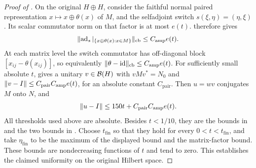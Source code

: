 \begin{proof}[Proof of ]
On the original $H\oplus H$, consider the faithful normal paired
representation $x\mapsto x\oplus\theta(x)$ of $M$, and the selfadjoint
switch $s(\xi,\eta)=(\eta,\xi)$.  Its scalar commutator norm on that
factor is at most $e(t)$.   therefore gives
\[
 \lVert\operatorname{ad}_s|_{\{x\oplus\theta(x):x\in M\}}\rVert_{\mathrm{cb}}
 \le C_{\mathrm{amp}}e(t).
\]
At each matrix level the switch commutator has off-diagonal block
$[x_{ij}-\theta(x_{ij})]$, so equivalently
$\lVert\theta-\operatorname{id}\rVert_{\mathrm{cb}}\le C_{\mathrm{amp}}e(t)$.
For sufficiently small absolute $t$,  gives a unitary
$v\in\mathcal B(H)$ with $vMv^*=N_0$ and
$\lVert v-I\rVert\le C_{\mathrm{pair}}C_{\mathrm{amp}}e(t)$, for an absolute
constant $C_{\mathrm{pair}}$.  Then $u=wv$ conjugates $M$ onto $N$, and
\[
 \lVert u-I\rVert\le150t+C_{\mathrm{pair}}C_{\mathrm{amp}}e(t).
\]
All thresholds used above are absolute.  Besides $t<1/10$, they are the
bounds in  and the two bounds in
.  Choose $t_{\mathrm{fin}}$ so that they hold for every
$0<t<t_{\mathrm{fin}}$, and take $\eta_{\mathrm{fin}}$ to be the maximum
of the displayed bound and the matrix-factor bound.  These bounds are
nondecreasing functions of $t$ and tend to zero.  This establishes the
claimed uniformity on the original Hilbert space.
\end{proof}
